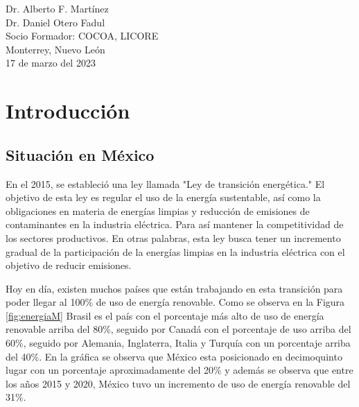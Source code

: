 \documentclass{article}
\begin{document}
\begin{titlepage}
\begin{center}
\begin{table}[h!]
\begin{tabular}{ ||c|c|| }
                    \hline
                \end{tabular}
            \end{table}
            \vspace{0.7cm}
            \large 	Dr. Alberto F. Martínez \\ %
            \vspace{0.2cm}
            \large 	Dr. Daniel Otero Fadul\\ %
            \vspace{0.2cm}
            \large Socio Formador: COCOA, LICORE \\
            \vspace{0.2cm}
            \large Monterrey, Nuevo León \\
            \vspace{0.2cm}
            \large 17 de marzo del 2023 \\
            \vspace{1cm}
        \end{center}
    \end{titlepage}

    \tableofcontents
    \listoffigures
    \listoftables
    \clearpage
    \renewcommand{\tablename}{Tabla}

    \section{Introducción}

        \subsection{Situación en México}

            En el 2015, se estableció una ley llamada "Ley de transición energética." El objetivo de esta ley es regular el uso de la energía sustentable, así como la obligaciones en materia de energías limpias y reducción de emisiones de contaminantes en la industria eléctrica. Para así mantener la competitividad de los sectores productivos. \cite{gobmx} En otras palabras, esta ley busca tener un incremento gradual de la participación de la energías limpias en la industria eléctrica con el objetivo de reducir emisiones.

            Hoy en día, existen muchos países que están trabajando en esta transición para poder llegar al 100\% de uso de energía renovable. Como se observa en la Figura \ref{fig:energiaM} Brasil es el país con el porcentaje más alto de uso de energía renovable arriba del 80\%, seguido por Canadá con el porcentaje de uso arriba del 60\%, seguido por Alemania, Inglaterra, Italia y Turquía con un porcentaje arriba del 40\%. En la gráfica se observa que México esta posicionado en decimoquinto lugar con un porcentaje aproximadamente del 20\% y además se observa que entre los años 2015 y 2020, México tuvo un incremento de uso de energía renovable del 31\%. \cite{climate_transparency}
\end{document}

